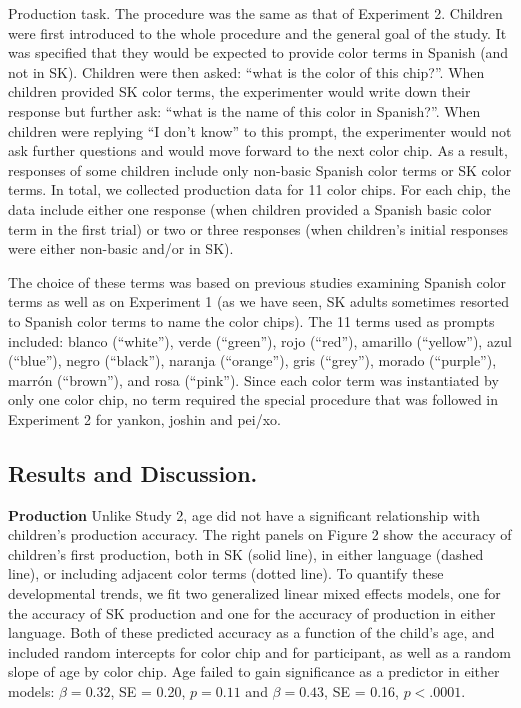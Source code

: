 \documentclass[,man,floatsintext]{apa6}
\theoremstyle{definition}
\theoremstyle{definition}
\theoremstyle{definition}
\theoremstyle{remark}
\begin{document}
Production task. The procedure was the same as that of Experiment 2.
Children were first introduced to the whole procedure and the general
goal of the study. It was specified that they would be expected to
provide color terms in Spanish (and not in SK). Children were then
asked: \enquote{what is the color of this chip?}. When children provided
SK color terms, the experimenter would write down their response but
further ask: \enquote{what is the name of this color in Spanish?}. When
children were replying \enquote{I don't know} to this prompt, the
experimenter would not ask further questions and would move forward to
the next color chip. As a result, responses of some children include
only non-basic Spanish color terms or SK color terms. In total, we
collected production data for 11 color chips. For each chip, the data
include either one response (when children provided a Spanish basic
color term in the first trial) or two or three responses (when
children's initial responses were either non-basic and/or in SK).

The choice of these terms was based on previous studies examining
Spanish color terms as well as on Experiment 1 (as we have seen, SK
adults sometimes resorted to Spanish color terms to name the color
chips). The 11 terms used as prompts included: blanco (\enquote{white}),
verde (\enquote{green}), rojo (\enquote{red}), amarillo
(\enquote{yellow}), azul (\enquote{blue}), negro (\enquote{black}),
naranja (\enquote{orange}), gris (\enquote{grey}), morado
(\enquote{purple}), marrón (\enquote{brown}), and rosa (\enquote{pink}).
Since each color term was instantiated by only one color chip, no term
required the special procedure that was followed in Experiment 2 for
yankon, joshin and pei/xo.

\subsection{Results and Discussion.}\label{results-and-discussion.}

\textbf{Production} Unlike Study 2, age did not have a significant
relationship with children's production accuracy. The right panels on
Figure 2 show the accuracy of children's first production, both in SK
(solid line), in either language (dashed line), or including adjacent
color terms (dotted line). To quantify these developmental trends, we
fit two generalized linear mixed effects models, one for the accuracy of
SK production and one for the accuracy of production in either language.
Both of these predicted accuracy as a function of the child's age, and
included random intercepts for color chip and for participant, as well
as a random slope of age by color chip. Age failed to gain significance
as a predictor in either models: \(\beta = 0.32\), SE = 0.20,
\(p = 0.11\) and \(\beta = 0.43\), SE = 0.16, \(p < .0001\).
\end{document}
